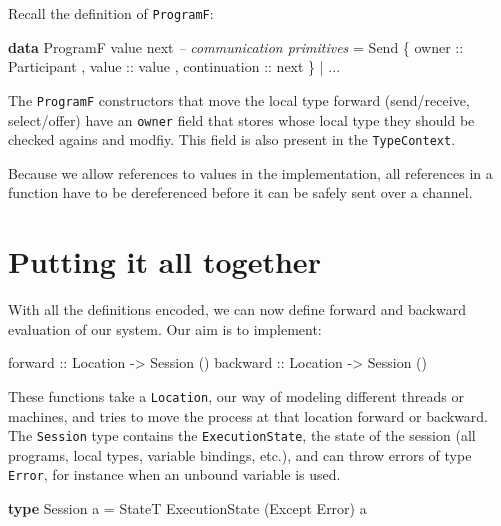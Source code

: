 \documentclass[runningheads,plain]{llncs}
\newenvironment{Shaded}{}{}
\newcommand{\KeywordTok}[1]{\textcolor[rgb]{0.00,0.44,0.13}{\textbf{#1}}}
\newcommand{\DataTypeTok}[1]{\textcolor[rgb]{0.56,0.13,0.00}{#1}}
\newcommand{\CommentTok}[1]{\textcolor[rgb]{0.38,0.63,0.69}{\textit{#1}}}
\newcommand{\OtherTok}[1]{\textcolor[rgb]{0.00,0.44,0.13}{#1}}
\newcommand{\FunctionTok}[1]{\textcolor[rgb]{0.02,0.16,0.49}{#1}}
\newcommand{\NormalTok}[1]{#1}
\begin{document}
Recall the definition of \texttt{ProgramF}:

\begin{Shaded}
\begin{Highlighting}[]
\KeywordTok{data} \DataTypeTok{ProgramF}\NormalTok{ value next }
    \CommentTok{-- communication primitives}
    \FunctionTok{=} \DataTypeTok{Send} 
\NormalTok{        \{}\OtherTok{ owner ::} \DataTypeTok{Participant}
\NormalTok{        ,}\OtherTok{ value ::}\NormalTok{ value}
\NormalTok{        ,}\OtherTok{ continuation ::}\NormalTok{ next }
\NormalTok{        \}}
    \FunctionTok{|} \FunctionTok{...} 
\end{Highlighting}
\end{Shaded}

The \texttt{ProgramF} constructors that move the local type forward
(send/receive, select/offer) have an \texttt{owner} field that stores
whose local type they should be checked agains and modfiy. This field is
also present in the \texttt{TypeContext}.

Because we allow references to values in the implementation, all
references in a function have to be dereferenced before it can be safely
sent over a channel.

\section{Putting it all together}\label{combining}

With all the definitions encoded, we can now define forward and backward
evaluation of our system. Our aim is to implement:

\begin{Shaded}
\begin{Highlighting}[]
\OtherTok{forward  ::} \DataTypeTok{Location} \OtherTok{->} \DataTypeTok{Session}\NormalTok{ ()}
\OtherTok{backward ::} \DataTypeTok{Location} \OtherTok{->} \DataTypeTok{Session}\NormalTok{ ()}
\end{Highlighting}
\end{Shaded}

These functions take a \texttt{Location}, our way of modeling different
threads or machines, and tries to move the process at that location
forward or backward. The \texttt{Session} type contains the
\texttt{ExecutionState}, the state of the session (all programs, local
types, variable bindings, etc.), and can throw errors of type
\texttt{Error}, for instance when an unbound variable is used.

\begin{Shaded}
\begin{Highlighting}[]
\KeywordTok{type} \DataTypeTok{Session}\NormalTok{ a }\FunctionTok{=} \DataTypeTok{StateT} \DataTypeTok{ExecutionState}\NormalTok{ (}\DataTypeTok{Except} \DataTypeTok{Error}\NormalTok{) a}
\end{Highlighting}
\end{Shaded}
\end{document}
